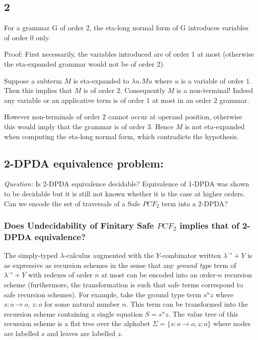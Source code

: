 \documentclass{article}
\begin{document}
\subsection{2}

For a grammar G of order 2, the eta-long normal form of G introduces variables
of order 0 only.

Proof: First necessarily, the variables introduced are of order 1 at most
(otherwise the eta-expanded grammar would not be of order 2).

Suppose a subterm $M$ is eta-expanded to $\lambda u . M u$ where $u$ is a variable
of order $1$. Then this implies that $M$ is of order $2$. Consequently $M$ is a non-terminal!
Indeed any variable or an applicative term is of order $1$ at most in an order $2$ grammar.

However non-terminals of order $2$ cannot occur at operand position, otherwise this would imply that
the grammar is of order $3$. Hence $M$ is not eta-expanded when computing the eta-long normal form, which contradicts the hypothesis.


\subsection{2-DPDA equivalence problem:}

\emph{Question:} Is 2-DPDA equivalence decidable?
Equivalence of 1-DPDA was shown to be decidable but it is still not known
whether it is the case at higher orders.
Can we encode the set of traversals of a Safe $PCF_2$ term into a 2-DPDA?

\subsubsection{Does Undecidability of Finitary Safe $PCF_2$ implies
that of 2-DPDA equivalence?}

The simply-typed $\lambda$-calculus augmented with the
$Y$-combinator written $\lambda^\rightarrow + Y$ is as expressive as
recursion schemes in the sense that any \emph{ground type} term of
$\lambda^\rightarrow + Y$ with redexes of order $n$ at most can be
encoded into an order-$n$ recursion scheme (furthermore, the
transformation is such that safe terms correspond to safe recursion
schemes). For example, take the ground type term $s^n z$ where
$s:o\rightarrow o$, $z :o$ for some natural number $n$. This term
can be transformed into the recursion scheme containing a single
equation $S = s^n z$. The value tree of this recursion scheme is a
flat tree over the alphabet $\Sigma = \{s:o\rightarrow o, z:o\}$
where nodes are labelled $s$ and leaves are labelled $z$.
\end{document}
